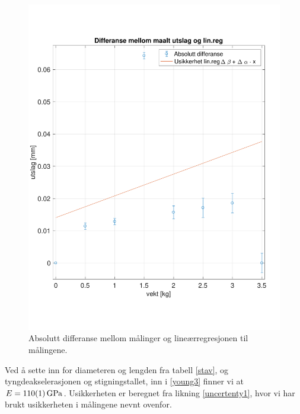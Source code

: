 \documentclass[%
 reprint,
 amsmath,amssymb,
 aps,
 norsk,
 booktabs
]{revtex4-1}
\begin{document}
\begin{figure}[h!]
  \centering
  \includegraphics[scale=0.4]{usikkerhet.pdf}
  \caption{Absolutt differanse mellom målinger og lineærregresjonen til målingene.}
  \label{data_usikker}
\end{figure}
Ved å sette inn for diameteren og lengden fra tabell \vref{stav}, og tyngdeakselerasjonen og stigningstallet, inn i \eqref{young3} finner vi at $E=\SI{110\pm1}{\giga\pascal}$. Usikkerheten er beregnet fra likning \eqref{uncertenty1}, hvor vi har brukt usikkerheten i målingene nevnt ovenfor.
\end{document}
